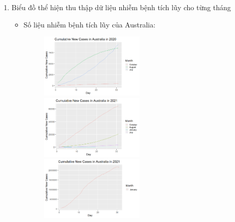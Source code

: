 \documentclass[a4paper]{article}
\theoremstyle{definition}
\begin{document}
\begin{enumerate}[i)]
\begin{enumerate}[1]
    \item Biểu đồ thể hiện thu thập dữ liệu nhiễm bệnh tích lũy cho từng tháng
    \vspace{10cm}
     \begin{itemize}
    \item{Số liệu nhiễm bệnh tích lũy của Australia:}\\ 
     \begin{figure}[htp!]
    \includegraphics[width=0.5\textwidth]{Images/7.1v.png}
    \includegraphics[width=0.5\textwidth]{Images/7.2v.png}
    \includegraphics[width=0.5\textwidth]{Images/7.3v.png}
  \end{figure}
    \end{itemize}
    

\end{enumerate}
\end{enumerate}
\end{document}
